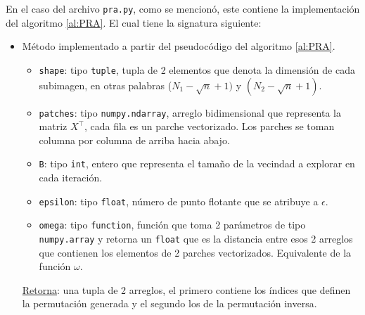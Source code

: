 En el caso del archivo \texttt{pra.py}, como se mencion\'o, este contiene la implementaci\'on del algoritmo \ref{al:PRA}. El cual tiene la signatura siguiente:
\begin{itemize}
	\item M\'etodo implementado a partir del pseudoc\'odigo del algoritmo \ref{al:PRA}.
	
	\begin{itemize}
		\item \texttt{shape}: tipo \texttt{tuple}, tupla de 2 elementos que denota la dimensi\'on de cada subimagen, en otras palabras ($N_1 - \sqrt{n} + 1)$ y $(N_2 - \sqrt{n} + 1)$.
		\item \texttt{patches}: tipo \texttt{numpy.ndarray}, arreglo bidimensional que representa la matriz $X^\intercal$, cada fila es un parche vectorizado. Los parches se toman columna por columna de arriba hacia abajo.
		\item \texttt{B}: tipo \texttt{int}, entero que representa el tamaño de la vecindad a explorar en cada iteraci\'on.
		\item \texttt{epsilon}: tipo \texttt{float}, n\'umero de punto flotante que se atribuye a $\epsilon$.
		\item \texttt{omega}: tipo \texttt{function}, funci\'on que toma 2 par\'ametros de tipo \texttt{numpy.array} y retorna un \texttt{float} que es la distancia entre esos 2 arreglos que contienen los elementos de 2 parches vectorizados. Equivalente de la funci\'on $\omega$.
	\end{itemize}
	\underline{Retorna}: una tupla de 2 arreglos, el primero contiene los \'indices que definen la permutaci\'on generada y el segundo los de la permutaci\'on inversa.
\end{itemize}

